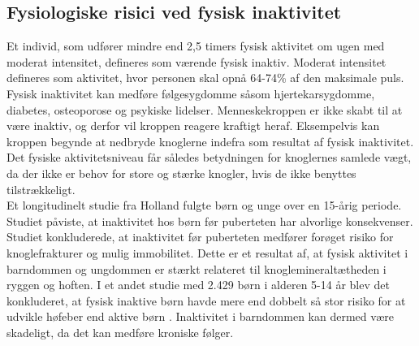 \subsection{Fysiologiske risici ved fysisk inaktivitet}\label{subsec:inover}
Et individ, som udfører mindre end 2,5 timers fysisk aktivitet om ugen med moderat intensitet, defineres som værende fysisk inaktiv. Moderat intensitet defineres som aktivitet, hvor personen skal opnå 64-74\% af den maksimale puls. \citep{Kiens2007} \\
Fysisk inaktivitet kan medføre følgesygdomme såsom hjertekarsygdomme, diabetes, osteoporose og psykiske lidelser. Menneskekroppen er ikke skabt til at være inaktiv, og derfor vil kroppen reagere kraftigt heraf. Eksempelvis kan kroppen begynde at nedbryde knoglerne indefra som resultat af fysisk inaktivitet. Det fysiske aktivitetsniveau får således betydningen for knoglernes samlede vægt, da der ikke er behov for store og stærke knogler, hvis de ikke benyttes tilstrækkeligt.~\citep{Kiens2007,Reshma2002,Martini2012} \\
Et longitudinelt studie fra Holland fulgte børn og unge over en 15-årig periode. Studiet påviste, at inaktivitet hos børn før puberteten har alvorlige konsekvenser. Studiet konkluderede, at inaktivitet før puberteten medfører forøget risiko for knoglefrakturer og mulig immobilitet. Dette er et resultat af, at fysisk aktivitet i barndommen og ungdommen er stærkt relateret til knoglemineraltætheden i ryggen og hoften. \citep{Kemper2000} I et andet studie med 2.429 børn i alderen 5-14 år blev det konkluderet, at fysisk inaktive børn havde mere end dobbelt så stor risiko for at udvikle høfeber end aktive børn \citep{Kohlhammer2006}. Inaktivitet i barndommen kan dermed være skadeligt, da det kan medføre kroniske følger.

